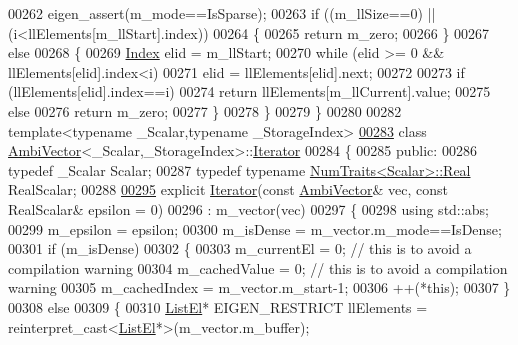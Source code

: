 \begin{DoxyCode}
00262     eigen\_assert(m\_mode==IsSparse);
00263     \textcolor{keywordflow}{if} ((m\_llSize==0) || (i<llElements[m\_llStart].index))
00264     \{
00265       \textcolor{keywordflow}{return} m\_zero;
00266     \}
00267     \textcolor{keywordflow}{else}
00268     \{
00269       \hyperlink{namespace_eigen_a62e77e0933482dafde8fe197d9a2cfde}{Index} elid = m\_llStart;
00270       \textcolor{keywordflow}{while} (elid >= 0 && llElements[elid].index<i)
00271         elid = llElements[elid].next;
00272 
00273       \textcolor{keywordflow}{if} (llElements[elid].index==i)
00274         \textcolor{keywordflow}{return} llElements[m\_llCurrent].value;
00275       \textcolor{keywordflow}{else}
00276         \textcolor{keywordflow}{return} m\_zero;
00277     \}
00278   \}
00279 \}
00280 
00282 \textcolor{keyword}{template}<\textcolor{keyword}{typename} \_Scalar,\textcolor{keyword}{typename} \_StorageIndex>
\hyperlink{class_eigen_1_1internal_1_1_ambi_vector_1_1_iterator}{00283} \textcolor{keyword}{class }\hyperlink{class_eigen_1_1internal_1_1_ambi_vector}{AmbiVector}<\_Scalar,\_StorageIndex>::\hyperlink{class_eigen_1_1internal_1_1_ambi_vector_1_1_iterator}{Iterator}
00284 \{
00285   \textcolor{keyword}{public}:
00286     \textcolor{keyword}{typedef} \_Scalar Scalar;
00287     \textcolor{keyword}{typedef} \textcolor{keyword}{typename} \hyperlink{group___core___module_struct_eigen_1_1_num_traits}{NumTraits<Scalar>::Real} RealScalar;
00288 
\hyperlink{class_eigen_1_1internal_1_1_ambi_vector_1_1_iterator_a2201eecfa8e104d9f2017e47c5f24583}{00295}     \textcolor{keyword}{explicit} \hyperlink{class_eigen_1_1internal_1_1_ambi_vector_1_1_iterator_a2201eecfa8e104d9f2017e47c5f24583}{Iterator}(\textcolor{keyword}{const} \hyperlink{class_eigen_1_1internal_1_1_ambi_vector}{AmbiVector}& vec, \textcolor{keyword}{const} RealScalar& epsilon = 0)
00296       : m\_vector(vec)
00297     \{
00298       \textcolor{keyword}{using} std::abs;
00299       m\_epsilon = epsilon;
00300       m\_isDense = m\_vector.m\_mode==IsDense;
00301       \textcolor{keywordflow}{if} (m\_isDense)
00302       \{
00303         m\_currentEl = 0;   \textcolor{comment}{// this is to avoid a compilation warning}
00304         m\_cachedValue = 0; \textcolor{comment}{// this is to avoid a compilation warning}
00305         m\_cachedIndex = m\_vector.m\_start-1;
00306         ++(*this);
00307       \}
00308       \textcolor{keywordflow}{else}
00309       \{
00310         \hyperlink{struct_eigen_1_1internal_1_1_ambi_vector_1_1_list_el}{ListEl}* EIGEN\_RESTRICT llElements = \textcolor{keyword}{reinterpret\_cast<}\hyperlink{struct_eigen_1_1internal_1_1_ambi_vector_1_1_list_el}{ListEl}*\textcolor{keyword}{>}(m\_vector.m\_buffer);

\end{DoxyCode}
